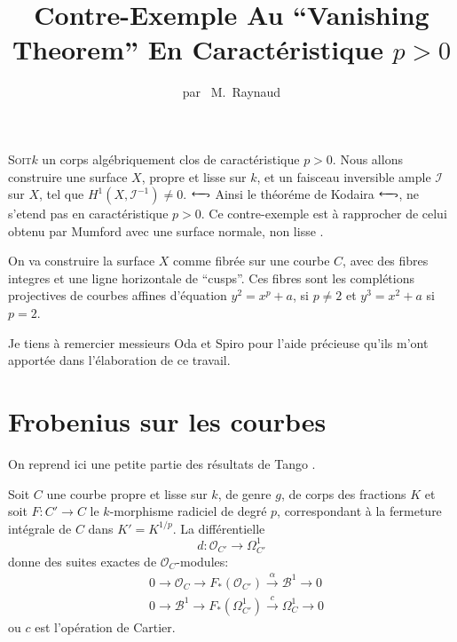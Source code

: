 \title{Contre-Exemple Au ``Vanishing Theorem'' En Caract\'eristique \texorpdfstring{$p>0$}{p0}}\label{art03}

\author{par~ M.~Raynaud}

\date{}
\maketitle

\setcounter{page}{319}

\setcounter{pageoriginal}{272}
\textsc{Soit}\pageoriginale $k$ un corps alg\'ebriquement clos de
caract\'eristique $p>0$. Nous allons construire une surface $X$,
propre et lisse sur $k$, et un faisceau inversible ample $\mathscr{I}$
sur $X$, tel que $H^{1}(X,\mathscr{I}^{-1})\neq 0$. $\hleftarrow$
Ainsi le th\'eor\'eme de Kodaira \cite{art03-key2} $\hleftarrow$, ne
s'etend pas en caract\'eristique $p>0$. Ce contre-exemple est \`a
rapprocher de celui obtenu par Mumford avec une surface normale, non
lisse \cite{art03-key5}.

On va construire la surface $X$ comme fibr\'ee sur une courbe $C$,
avec des fibres integres et une ligne horizontale de ``cusps''. Ces
fibres sont les compl\'etions projectives de courbes affines
d'\'equa\-tion $y^{2}=x^{p}+a$, si $p\neq 2$ et $y^{3}=x^{2}+a$ si
$p=2$.

Je tiens \`a remercier messieurs Oda et Spiro pour l'aide pr\'ecie\-use
qu'ils m'ont apport\'ee dans l'\'elaboration de ce travail.

\section{Frobenius sur les courbes}\label{art03-sec1}

On reprend ici une petite partie des r\'esultats de
Tango \cite{art03-key6}. 

Soit $C$ une courbe propre et lisse sur $k$, de genre $g$, de corps
des fractions $K$ et soit $F:C'\to C$ le $k$-morphisme radiciel de
degr\'e $p$, correspondant \`a la fermeture int\'egrale de $C$ dans
$K'=K^{1/p}$. La diff\'erentielle
$$
d:\mathscr{O}_{C'}\to \Omega^{1}_{C'}
$$
donne des suites exactes de $\mathscr{O}_{C}$-modules:
\begin{align}
& 0\to \mathscr{O}_{C}\to
F_{*}(\mathscr{O}_{C'})\xrightarrow{\alpha}\mathscr{B}^{1}\to
0\label{art03-eq1}\\
& 0\to \mathscr{B}^{1}\to
F_{*}(\Omega^{1}_{C'})\xrightarrow{c}\Omega^{1}_{C}\to 0\label{art03-eq2}
\end{align}
ou $c$ est l'op\'eration de Cartier.

